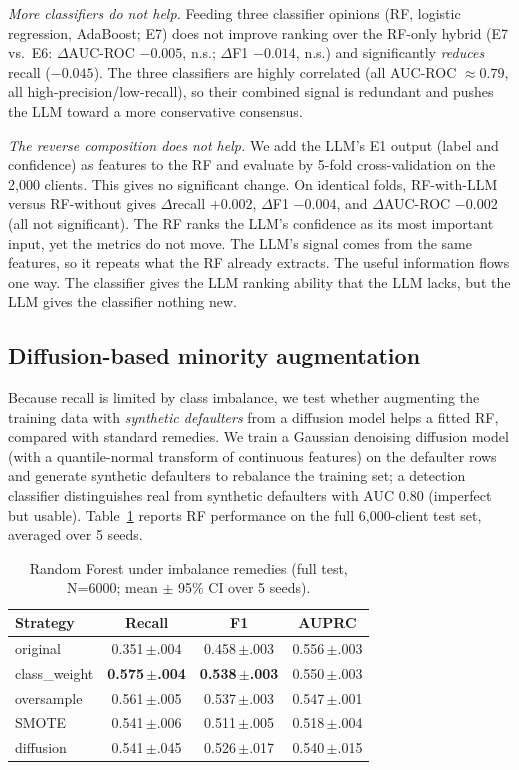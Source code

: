 \documentclass[conference]{IEEEtran}
\begin{document}
\textit{More classifiers do not help.} Feeding three classifier opinions (RF, logistic regression, AdaBoost; E7) does not improve ranking over the RF-only hybrid (E7 vs.\ E6: $\Delta$AUC-ROC $-0.005$, n.s.; $\Delta$F1 $-0.014$, n.s.) and significantly \emph{reduces} recall ($-0.045$). The three classifiers are highly correlated (all AUC-ROC $\approx 0.79$, all high-precision/low-recall), so their combined signal is redundant and pushes the LLM toward a more conservative consensus.

\textit{The reverse composition does not help.} We add the LLM's E1 output (label and confidence) as features to the RF and evaluate by 5-fold cross-validation on the 2{,}000 clients. This gives no significant change. On identical folds, RF-with-LLM versus RF-without gives $\Delta$recall $+0.002$, $\Delta$F1 $-0.004$, and $\Delta$AUC-ROC $-0.002$ (all not significant). The RF ranks the LLM's confidence as its most important input, yet the metrics do not move. The LLM's signal comes from the same features, so it repeats what the RF already extracts. The useful information flows one way. The classifier gives the LLM ranking ability that the LLM lacks, but the LLM gives the classifier nothing new.

\subsection{Diffusion-based minority augmentation}
\label{sec:diffusion}
Because recall is limited by class imbalance, we test whether augmenting the training data with \emph{synthetic defaulters} from a diffusion model helps a fitted RF, compared with standard remedies. We train a Gaussian denoising diffusion model (with a quantile-normal transform of continuous features) on the defaulter rows and generate synthetic defaulters to rebalance the training set; a detection classifier distinguishes real from synthetic defaulters with AUC $0.80$ (imperfect but usable). Table~\ref{tab:diffusion} reports RF performance on the full 6{,}000-client test set, averaged over 5 seeds.

\begin{table}[!t]
\caption{Random Forest under imbalance remedies (full test, N=6000; mean $\pm$ 95\% CI over 5 seeds).}
\label{tab:diffusion}
\centering
\setlength{\tabcolsep}{3pt}
\footnotesize
\begin{tabular}{lccc}
\toprule
Strategy & Recall & F1 & AUPRC \\
\midrule
original            & 0.351\,$\pm$.004 & 0.458\,$\pm$.003 & 0.556\,$\pm$.003 \\
class\_weight       & \textbf{0.575\,$\pm$.004} & \textbf{0.538\,$\pm$.003} & 0.550\,$\pm$.003 \\
oversample          & 0.561\,$\pm$.005 & 0.537\,$\pm$.003 & 0.547\,$\pm$.001 \\
SMOTE               & 0.541\,$\pm$.006 & 0.511\,$\pm$.005 & 0.518\,$\pm$.004 \\
diffusion           & 0.541\,$\pm$.045 & 0.526\,$\pm$.017 & 0.540\,$\pm$.015 \\
\bottomrule
\end{tabular}
\end{table}
\end{document}

